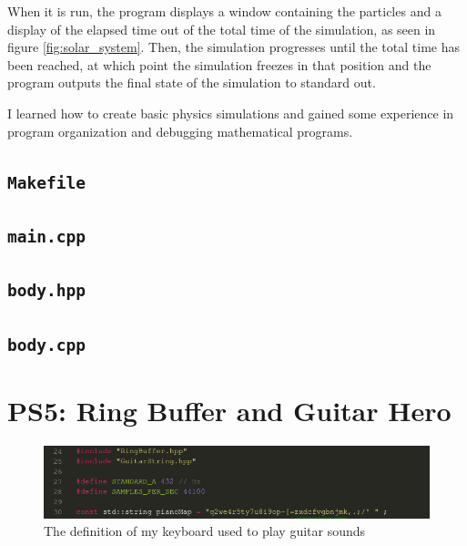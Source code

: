 \documentclass[12pt]{article}
\begin{document}
When it is run, the program displays a window containing the particles and a display of the elapsed time out of the total time of the simulation, as seen in figure \ref{fig:solar_system}. Then, the simulation progresses until the total time has been reached, at which point the simulation freezes in that position and the program outputs the final state of the simulation to standard out.

I learned how to create basic physics simulations and gained some experience in program organization and debugging mathematical programs.

\subsection{\texttt{Makefile}}



\subsection{\texttt{main.cpp}}



\subsection{\texttt{body.hpp}}



\subsection{\texttt{body.cpp}}



\newpage

\section{PS5: Ring Buffer and Guitar Hero}

\begin{figure}

\includegraphics[scale=0.6]{../ps5b/keymapping.png}
\centering
\caption{The definition of my keyboard used to play guitar sounds}
\label{fig:piano_map}
\end{figure}
\end{document}
